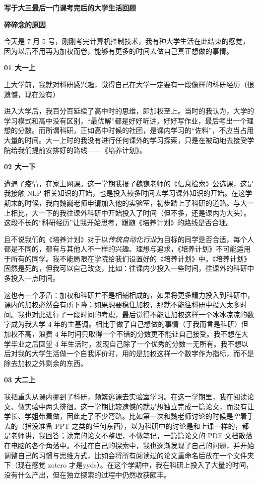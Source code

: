 \textbf{写于大三最后一门课考完后的大学生活回顾}

\textbf{碎碎念的原因}

今天是 7 月 5
号，刚刚考完计算机控制技术，我有种大学生活在此结束的感觉，因为以后不用再为加权而卷，能够有更多的时间去做自己真正想做的事情。

\textbf{01 大一上}

上大学前，我就对科研感兴趣，觉得自己在大学一定要有一段像样的科研经历（很遗憾，现在没有）

进入大学后，我百分百延续了高中时的思维，即加权至上。当时的我认为，大学的学习模式和高中没有区别，``最优解''都是好好听讲，好好写作业，最后考出一个理想的分数。而所谓科研，正如高中时候的社团，是课内学习的``佐料''，不应当占用大量的时间。大一上时的我没有进行任何课外的学习探索，只是在被动地去接受学院给我们提前安排好的路线------《培养计划》。

\textbf{02 大一下}

遭遇了疫情，在家上网课。这一学期我报了魏巍老师的《信息检索》公选课，这是我接触
NLP
相关知识的开始，也是投入较多时间去学习课外知识的开始。在这学期末的时候，我向魏巍老师申请加入他的实验室，初步踏上了科研的道路。与大一上相比，大一下的我往课外科研中开始投入了时间（但不多，还是课内为大头）。这段不长的``科研经历''让我开始思考，跟随《培养计划》的路线是否合理。

且不说我们的《培养计划》对于以\emph{传统自动化行业}为目标的同学是否合适，每个人都是不同的，都有与其他人不一样的兴趣、理想与追求，《培养计划》不可能适用于所有的同学。我不能局限在学院给我们设置好的《培养计划》中。《培养计划》固然是死的，但我可以自己改变，比如：往课内少投入一些时间，往课外的科研中多投入一点时间。

这也有一个矛盾：加权和科研并不是相辅相成的，如果将更多精力投入到科研中，课内的加权必然会有所下降；如果想要稳住加权，那就不能往科研中投入太多时间。我也对此进行了一段时间的考虑，最后觉得不能让加权这样一个冰冰凉凉的数字成为我大学
4 年的主基调。相比于做了自己想做的事情（于我而言是科研）但加权不高，浪费
4 年时间只取得一个不错的分数更不能让自己接受。我不想在大学毕业之后回望 4
年生活时，发现自己除了一个优秀的分数一无所有。我不想以后对我的大学生活做一个自我评价时，用的是加权这样一个数字作为指标，而不是除去加权之外剩余的东西。

\textbf{03 大二上}

我把重头从课内挪到了科研，频繁逃课去实验室学习。在这一学期里，我在阅读论文、做实验中两头徘徊。这一学期比较遗憾的就是想独立完成一篇论文，而没有让学长、学姐带着做，因此走了不少弯路。比如第一次和魏老师讨论的时候是空着手去的（指没准备
PPT
之类的任何东西），以为科研中的讨论是和上课一样的，都是老师讲，我回答；读完的论文不整理，不做笔记，一篇篇论文的
PDF
文档散落在电脑的各个角落中。不过在自己的探索中，我也逐渐发现了自己的问题，并开始调整自己的习惯与思维方式，比如会将所有阅读过的论文重命名后放在一个文件夹下（现在感觉
zotero
才是yyds）。在这个学期中，我在科研上投入了大量的时间，没有什么产出，但在独立探索的过程中仍然收获颇丰。

